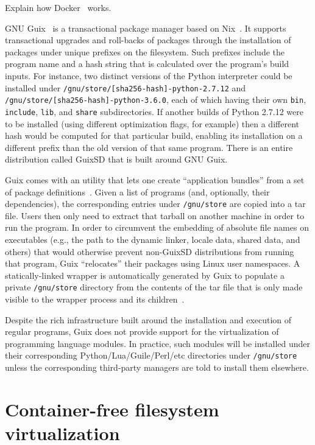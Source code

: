 \documentclass[sigplan, anonymous, 10pt]{acmart}
\begin{document}
Explain how Docker~\cite{fink2014:docker} works.
\lipsum[1-2]

GNU Guix~\cite{courtes2013:guix} is a transactional package manager based on Nix~\cite{dolstra2004:nix}.
It supports transactional upgrades and
roll-backs of packages through the installation of packages under unique prefixes on the filesystem.
Such prefixes include the program name and a hash string that is calculated over the program's
build inputs. For instance, two distinct versions of the Python interpreter could be installed
under \texttt{/gnu/store/[sha256-hash]-python-2.7.12} and \texttt{/gnu/store/[sha256-hash]-python-3.6.0},
each of which having their own \texttt{bin}, \texttt{include}, \texttt{lib}, and \texttt{share}
subdirectories. If another builds of Python 2.7.12 were to be installed (using different optimization
flags, for example) then a different hash would be computed for that particular build, enabling its
installation on a different prefix than the old version of that same program. There is an entire
distribution called GuixSD that is built around GNU Guix.

Guix comes with an utility that lets one create ``application bundles'' from a set of package
definitions~\cite{gnu2017:bundles}. Given a list of programs (and, optionally, their dependencies),
the corresponding entries under \texttt{/gnu/store} are copied into a tar file. Users then only
need to extract that tarball on another machine in order to run the program. In order to circumvent
the embedding of absolute file names on executables (e.g., the path to the dynamic linker, locale
data, shared data, and others) that would otherwise prevent non-GuixSD distributions from running
that program, Guix ``relocates'' their packages using Linux user namespaces. A statically-linked
wrapper is automatically generated by Guix to populate a private \texttt{/gnu/store} directory
from the contents of the tar file that is only made visible to the wrapper process and its
children~\cite{gnu2018:tarballs}.

Despite the rich infrastructure built around the installation and execution of regular programs,
Guix does not provide support for the virtualization of programming language modules. In practice,
such modules will be installed under their corresponding Python/Lua/Guile/Perl/etc directories
under \texttt{/gnu/store} unless the corresponding third-party managers are told to install them
elsewhere.


\section{Container-free filesystem virtualization}
\end{document}
